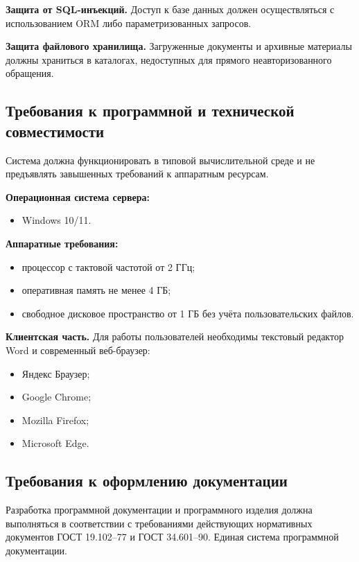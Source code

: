 \textbf{Защита от SQL-инъекций.}
Доступ к базе данных должен осуществляться с использованием ORM либо параметризованных запросов.

\textbf{Защита файлового хранилища.}
Загруженные документы и архивные материалы должны храниться в каталогах, недоступных для прямого неавторизованного обращения.

\subsection{Требования к программной и технической совместимости}

Система должна функционировать в типовой вычислительной среде и не предъявлять завышенных требований к аппаратным ресурсам.

\textbf{Операционная система сервера:}

\begin{itemize}
	\item Windows 10/11.
\end{itemize}

\textbf{Аппаратные требования:}

\begin{itemize}
	\item процессор с тактовой частотой от 2 ГГц;
	\item оперативная память не менее 4 ГБ;
	\item свободное дисковое пространство от 1 ГБ без учёта пользовательских файлов.
\end{itemize}

\textbf{Клиентская часть.}
Для работы пользователей необходимы текстовый редактор Word и современный веб-браузер:

\begin{itemize}
	\item Яндекс Браузер;
	\item Google Chrome;
	\item Mozilla Firefox;
	\item Microsoft Edge.
\end{itemize}



\subsection{Требования к оформлению документации}

Разработка программной документации и программного изделия должна выполняться в соответствии с требованиями действующих нормативных документов ГОСТ 19.102--77 и ГОСТ 34.601--90. Единая система программной документации.